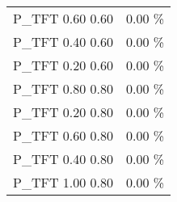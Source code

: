 \begin{tabular}{|l|r|}
P\_TFT 0.60 0.60              &    0.00 \% \\
P\_TFT 0.40 0.60              &    0.00 \% \\
P\_TFT 0.20 0.60              &    0.00 \% \\
P\_TFT 0.80 0.80              &    0.00 \% \\
P\_TFT 0.20 0.80              &    0.00 \% \\
P\_TFT 0.60 0.80              &    0.00 \% \\
P\_TFT 0.40 0.80              &    0.00 \% \\
P\_TFT 1.00 0.80              &    0.00 \% \\
\hline
\end{tabular}
